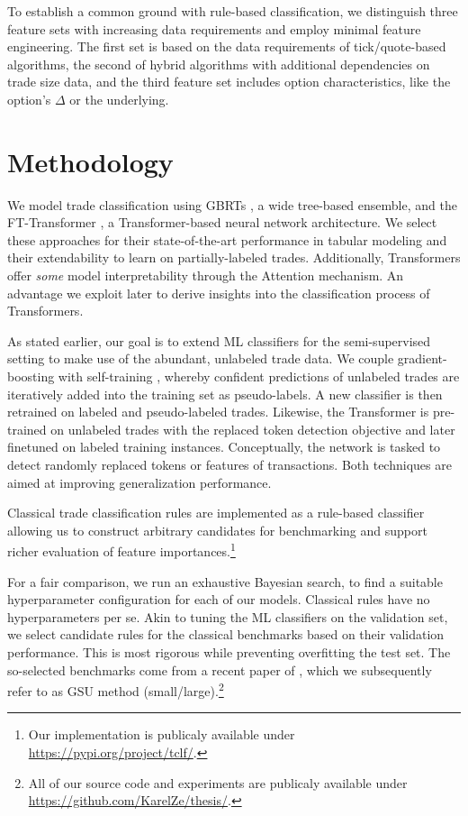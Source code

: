 To establish a common ground with rule-based classification, we distinguish three feature sets with increasing data requirements and employ minimal feature engineering. The first set is based on the data requirements of tick/quote-based algorithms, the second of hybrid algorithms with additional dependencies on trade size data, and the third feature set includes option characteristics, like the option's $\Delta$ or the underlying. 

\section{Methodology}

We model trade classification using \glspl{GBRT} \autocites[][]{friedmanGreedyFunctionApproximation2001}, a wide tree-based ensemble, and the FT-Transformer \autocite{gorishniyRevisitingDeepLearning2021}, a Transformer-based neural network architecture. We select these approaches for their state-of-the-art performance in tabular modeling \autocites[][]{gorishniyRevisitingDeepLearning2021}[][]{grinsztajnWhyTreebasedModels2022} and their extendability to learn on partially-labeled trades. Additionally, Transformers offer \textit{some} model interpretability through the Attention mechanism. An advantage we exploit later to derive insights into the classification process of Transformers.

As stated earlier, our goal is to extend \gls{ML} classifiers for the semi-supervised setting to make use of the abundant, unlabeled trade data. We couple gradient-boosting with self-training \autocite{yarowskyUnsupervisedWordSense1995}, whereby confident predictions of unlabeled trades are iteratively added into the training set as pseudo-labels. A new classifier is then retrained on labeled and pseudo-labeled trades. Likewise, the Transformer is pre-trained on unlabeled trades with the replaced token detection objective \autocite{clarkElectraPretrainingText2020} and later finetuned on labeled training instances. Conceptually, the network is tasked to detect randomly replaced tokens or features of transactions. Both techniques are aimed at improving generalization performance.

Classical trade classification rules are implemented as a rule-based classifier allowing us to construct arbitrary candidates for benchmarking and support richer evaluation of feature importances.\footnote{Our implementation is publicaly available under \url{https://pypi.org/project/tclf/}.}

For a fair comparison, we run an exhaustive Bayesian search, to find a suitable hyperparameter configuration for each of our models. Classical rules have no hyperparameters per se. Akin to tuning the \gls{ML} classifiers on the validation set, we select candidate rules for the classical benchmarks based on their validation performance. This is most rigorous while preventing overfitting the test set. The so-selected benchmarks come from a recent paper of \textcite{grauerOptionTradeClassification2022}, which we subsequently refer to as \gls{GSU} method (small/large).\footnote{All of our source code and experiments are publicaly available under \url{https://github.com/KarelZe/thesis/}.}

